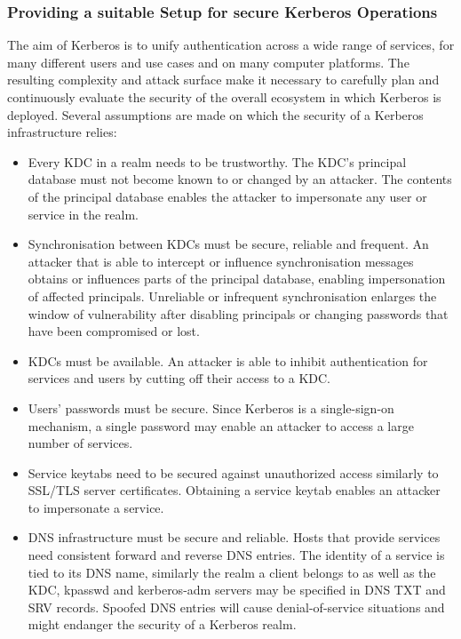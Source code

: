 \subsubsection{Providing a suitable Setup for secure Kerberos Operations}
\label{subsubsection:kerberos_secure_setup}

The aim of Kerberos is to unify authentication across a wide range of services, for many different users and use cases and on many computer platforms. The resulting complexity and attack surface make it necessary to carefully plan and continuously evaluate the security of the overall ecosystem in which Kerberos is deployed. Several assumptions are made on which the security of a Kerberos infrastructure relies:
\begin{itemize}
	\item Every KDC in a realm needs to be trustworthy. The KDC's principal database must not become known to or changed by an attacker. The contents of the principal database enables the attacker to impersonate any user or service in the realm.
	\item Synchronisation between KDCs must be secure, reliable and frequent. An attacker that is able to intercept or influence synchronisation messages obtains or influences parts of the principal database, enabling impersonation of affected principals. Unreliable or infrequent synchronisation enlarges the window of vulnerability after disabling principals or changing passwords that have been compromised or lost.
	\item KDCs must be available. An attacker is able to inhibit authentication for services and users by cutting off their access to a KDC.
	\item Users' passwords must be secure. Since Kerberos is a single-sign-on mechanism, a single password may enable an attacker to access a large number of services.
	\item Service keytabs need to be secured against unauthorized access similarly to SSL/TLS server certificates. Obtaining a service keytab enables an attacker to impersonate a service.
	\item DNS infrastructure must be secure and reliable. Hosts that provide services need consistent forward and reverse DNS entries. The identity of a service is tied to its DNS name, similarly the realm a client belongs to as well as the KDC, kpasswd and kerberos-adm servers may be specified in DNS TXT and SRV records. Spoofed DNS entries will cause denial-of-service situations and might endanger the security of a Kerberos realm.

\end{itemize}
